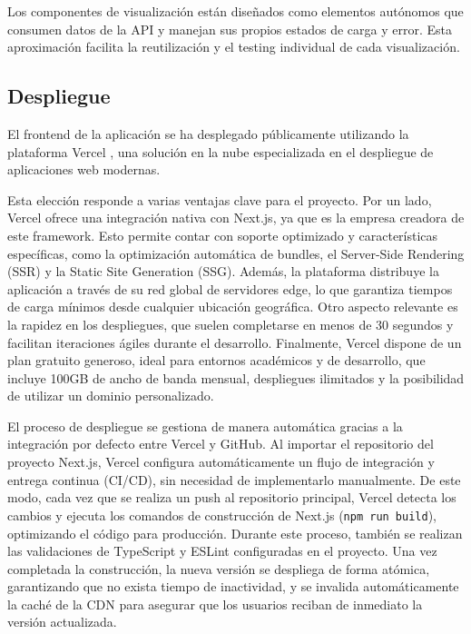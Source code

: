 Los componentes de visualización están diseñados como elementos autónomos que consumen datos de la API y manejan sus propios estados de carga y error. Esta aproximación facilita la reutilización y el testing individual de cada visualización.




\subsection{Despliegue}

El frontend de la aplicación se ha desplegado públicamente utilizando la plataforma Vercel \cite{vercel}, una solución en la nube especializada en el despliegue de aplicaciones web modernas. 

Esta elección responde a varias ventajas clave para el proyecto. Por un lado, Vercel ofrece una integración nativa con Next.js, ya que es la empresa creadora de este framework. Esto permite contar con soporte optimizado y características específicas, como la optimización automática de bundles, el Server-Side Rendering (SSR) y la Static Site Generation (SSG). Además, la plataforma distribuye la aplicación a través de su red global de servidores edge, lo que garantiza tiempos de carga mínimos desde cualquier ubicación geográfica. Otro aspecto relevante es la rapidez en los despliegues, que suelen completarse en menos de 30 segundos y facilitan iteraciones ágiles durante el desarrollo. Finalmente, Vercel dispone de un plan gratuito generoso, ideal para entornos académicos y de desarrollo, que incluye 100GB de ancho de banda mensual, despliegues ilimitados y la posibilidad de utilizar un dominio personalizado.

El proceso de despliegue se gestiona de manera automática gracias a la integración por defecto entre Vercel y GitHub. Al importar el repositorio del proyecto Next.js, Vercel configura automáticamente un flujo de integración y entrega continua (CI/CD), sin necesidad de implementarlo manualmente. De este modo, cada vez que se realiza un push al repositorio principal, Vercel detecta los cambios y ejecuta los comandos de construcción de Next.js (\texttt{npm run build}), optimizando el código para producción. Durante este proceso, también se realizan las validaciones de TypeScript y ESLint configuradas en el proyecto. Una vez completada la construcción, la nueva versión se despliega de forma atómica, garantizando que no exista tiempo de inactividad, y se invalida automáticamente la caché de la CDN para asegurar que los usuarios reciban de inmediato la versión actualizada.

